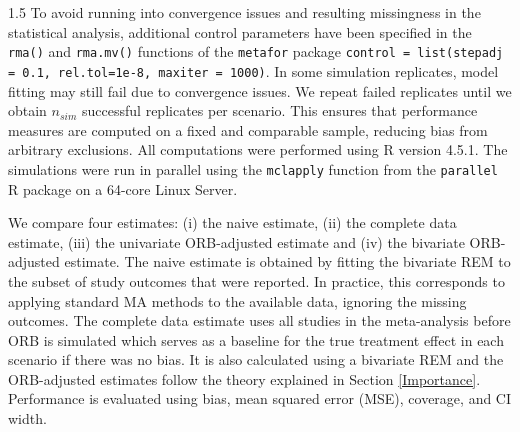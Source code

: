 \documentclass{article}
\begin{document}
\begin{spacing}{1.5}
To avoid running into convergence issues and resulting missingness in the statistical analysis, additional control parameters have been specified in the \texttt{rma()} and \texttt{rma.mv()} functions of the \texttt{metafor} package \ie \texttt{control = list(stepadj = 0.1,  rel.tol=1e-8, maxiter = 1000)}.  In some simulation replicates, model fitting may still fail due to convergence issues. We repeat failed replicates until we obtain $n_{sim}$ successful replicates per scenario. This ensures that performance measures are computed on a fixed and comparable sample, reducing bias from arbitrary exclusions. All computations were performed using R version 4.5.1. The simulations were run in parallel using the \texttt{mclapply} function from the \texttt{parallel} R package on a 64-core Linux Server. 

We compare four estimates: (i) the naive estimate, (ii) the complete data estimate, (iii) the univariate ORB-adjusted estimate and (iv) the bivariate ORB-adjusted estimate. The naive estimate is obtained by fitting the bivariate REM to the subset of study outcomes that were reported. In practice, this corresponds to applying standard MA methods to the available data, ignoring the missing outcomes. The  complete  data  estimate  uses  all  studies  in the  meta-analysis  before  ORB  is  simulated which serves as a baseline for the true treatment effect in each scenario if there was no bias. It is also calculated using a bivariate REM and the ORB-adjusted estimates follow the theory explained in Section \ref{Importance}. Performance is evaluated using bias, mean squared error (MSE), coverage, and CI width.



\end{spacing}
\end{document}
